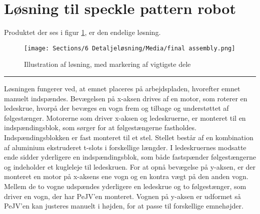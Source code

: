 \section{Løsning til speckle pattern robot} \label{Produkt}
Produktet der ses i figur \ref{fig: CAD full assembly}, er den endelige løsning.

\begin{figure}[H]
    \centering
    \texttt{[image: Sections/6 Detaljeløsning/Media/final assembly.png]}
    \caption{Illustration af løsning, med markering af vigtigste dele}
    \label{fig: CAD full assembly}
\end{figure} \plainbreak{-1}


Løsningen fungerer ved, at emnet placeres på arbejdspladen, hvorefter emnet manuelt indspændes. Bevægelsen på x-aksen drives af en motor, som roterer en ledeskrue, hvorpå der bevæges en vogn frem og tilbage og understøttet af følgestænger. Motorerne som driver x-aksen og ledeskruerne, er monteret til en indspændingsblok, som sørger for at følgestængerne fastholdes. Indspændingsblokken er fast monteret til et stel. Stellet består af en kombination af aluminium ekstruderet t-slots i forskellige længder. I ledeskruernes modsatte ende sidder yderligere en indspændingsblok, som både fastspænder følgestængerne og indeholder et kugleleje til ledeskruen. For at opnå bevægelse på y-aksen, er der monteret en motor på x-aksens ene vogn og en kontra vægt på den anden vogn. Mellem de to vogne udspændes yderligere en ledeskrue og to følgestænger, som driver en vogn, der har PeJV'en monteret. Vognen på y-aksen er udformet så PeJV'en kan justeres manuelt i højden, for at passe til forskellige emnehøjder. 



 

